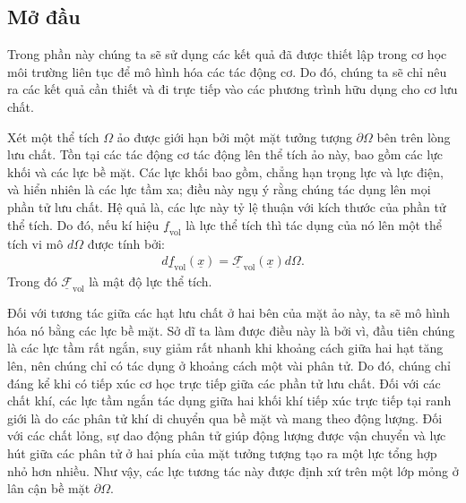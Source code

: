 \documentclass[../../../main.tex]{subfiles}
\begin{document}
\subsection{Mở đầu}
Trong phần này chúng ta sẽ sử dụng các kết quả đã được thiết lập trong cơ học môi trường liên tục để mô hình hóa các tác động cơ. Do đó, chúng ta sẽ chỉ nêu ra các kết quả cần thiết và đi trực tiếp vào các phương trình hữu dụng cho cơ lưu chất.

Xét một thể tích $\Omega$ ảo được giới hạn bởi một mặt tưởng tượng $\partial\Omega$ bên trên lòng lưu chất. Tồn tại các tác động cơ tác động lên thể tích ảo này, bao gồm các lực khối và các lực bề mặt. Các lực khối bao gồm, chẳng hạn trọng lực và lực điện, và hiển nhiên là các lực tầm xa; điều này ngụ ý rằng chúng tác dụng lên mọi phần tử lưu chất. Hệ quả là, các lực này tỷ lệ thuận với kích thước của phần tử thể tích. Do đó, nếu kí hiệu $\underline{f}_{\text{vol}}$ là lực thể tích thì tác dụng của nó lên một thể tích vi mô $d\Omega$ được tính bởi:
	\begin{align}
		d\underline{f}_{\text{vol}}\left(\underline{x}\right)=\underline{\mathcal{F}}_{\text{vol}}\left(\underline{x}\right)d\Omega.
	\end{align}
Trong đó $\underline{\mathcal{F}}_{\text{vol}}$ là mật độ lực thể tích.

Đối với tương tác giữa các hạt lưu chất ở hai bên của mặt ảo này, ta sẽ mô hình hóa nó bằng các lực bề mặt. Sở dĩ ta làm được điều này là bởi vì, đầu tiên chúng là các lực tầm rất ngắn, suy giảm rất nhanh khi khoảng cách giữa hai hạt tăng lên, nên chúng chỉ có tác dụng ở khoảng cách một vài phân tử. Do đó, chúng chỉ đáng kể khi có tiếp xúc cơ học trực tiếp giữa các phần tử lưu chất. Đối với các chất khí, các lực tầm ngắn tác dụng giữa hai khối khí tiếp xúc trực tiếp tại ranh giới là do các phân tử khí di chuyển qua bề mặt và mang theo động lượng. Đối với các chất lỏng, sự dao động phân tử giúp động lượng được vận chuyển và lực hút giữa các phân tử ở hai phía của mặt tưởng tượng tạo ra một lực tổng hợp nhỏ hơn nhiều. Như vậy, các lực tương tác này được định xứ trên một lớp mỏng ở lân cận bề mặt $\partial\Omega$.
\end{document}
